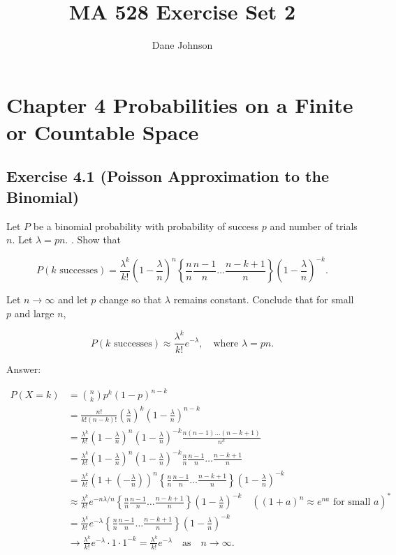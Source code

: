 \documentclass{article}
\title{MA 528 Exercise Set 2}
\author{Dane Johnson}
\begin{document}
\maketitle

\section*{Chapter 4 Probabilities on a Finite or Countable Space}

\subsection*{Exercise 4.1 (Poisson Approximation to the Binomial)}

Let $P$ be a binomial probability with probability of success $p$ and number of trials $n$. Let $\lambda = pn$. . Show that

$$
P(k \text{ successes}) = \frac{\lambda^k}{k!}(1-\frac{\lambda}{n})^n \left\lbrace\frac{n}{n}\frac{n-1}{n} \dots \frac{n-k+1}{n}\right\rbrace (1 - \frac{\lambda}{n})^{-k}.
$$

Let $n \rightarrow \infty$ and let $p$ change so that $\lambda$ remains constant. Conclude that for
small $p$ and large $n$,

$$
P(k \text{ successes}) \approx \frac{\lambda^k}{k!}e^{-\lambda}, \quad \text{where } \lambda = pn.
$$

Answer:


\begin{align*}
P(X = k) &= \binom{n}{k}p^k(1-p)^{n-k} \\
&= \frac{n!}{k!(n-k)!}\left(\frac{\lambda}{n}\right)^k \left(1 -\frac{\lambda}{n}\right)^{n-k} \\
&= \frac{\lambda^k}{k!}\left(1-\frac{\lambda}{n}\right)^n\left(1-\frac{\lambda}{n}\right)^{-k}\frac{n(n-1)\dots (n-k+1)}{n^k} \\
&= \frac{\lambda^k}{k!}\left(1-\frac{\lambda}{n}\right)^n\left(1-\frac{\lambda}{n}\right)^{-k}\frac{n}{n}\frac{n-1}{n} \dots \frac{n-k+1}{n} \\
&= \frac{\lambda^k}{k!}\left(1 + \left(-\frac{\lambda}{n}\right)\right)^n\left\lbrace\frac{n}{n}\frac{n-1}{n} \dots \frac{n-k+1}{n}\right\rbrace \left(1-\frac{\lambda}{n}\right)^{-k}\\
&\approx \frac{\lambda^k}{k!}e^{-n\lambda / n} \left\lbrace\frac{n}{n}\frac{n-1}{n} \dots \frac{n-k+1}{n}\right\rbrace \left(1-\frac{\lambda}{n}\right)^{-k} \quad ((1+a)^n \approx e^{na} \text{ for small } a)^* \\
&= \frac{\lambda^k}{k!}e^{-\lambda} \left\lbrace\frac{n}{n}\frac{n-1}{n} \dots \frac{n-k+1}{n}\right\rbrace \left(1-\frac{\lambda}{n}\right)^{-k}\\
&\rightarrow \frac{\lambda^k}{k!}e^{-\lambda} \cdot 1 \cdot  1^{-k} = \frac{\lambda^k}{k!}e^{-\lambda} \quad \text{as} \quad n \rightarrow \infty.
\end{align*}
\end{document}

